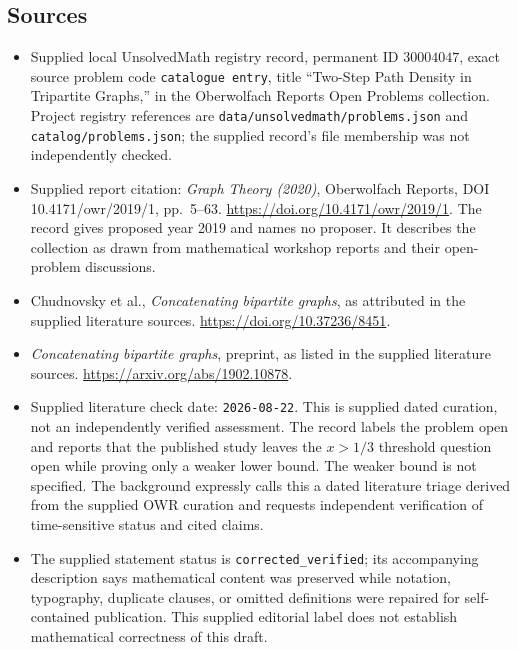 \documentclass[11pt]{article}
\begin{document}
\subsection{Sources}
\begin{itemize}
\item Supplied local UnsolvedMath registry record, permanent ID \(30004047\), exact source problem code \texttt{catalogue entry}, title ``Two-Step Path Density in Tripartite Graphs,'' in the Oberwolfach Reports Open Problems collection. Project registry references are \texttt{data/unsolvedmath/problems.json} and \texttt{catalog/problems.json}; the supplied record's file membership was not independently checked.
\item Supplied report citation: \emph{Graph Theory (2020)}, Oberwolfach Reports, DOI 10.4171/owr/2019/1, pp.\ 5--63. \url{https://doi.org/10.4171/owr/2019/1}. The record gives proposed year 2019 and names no proposer. It describes the collection as drawn from mathematical workshop reports and their open-problem discussions.
\item Chudnovsky et al., \emph{Concatenating bipartite graphs}, as attributed in the supplied literature sources. \url{https://doi.org/10.37236/8451}.
\item \emph{Concatenating bipartite graphs}, preprint, as listed in the supplied literature sources. \url{https://arxiv.org/abs/1902.10878}.
\item Supplied literature check date: \texttt{2026-08-22}. This is supplied dated curation, not an independently verified assessment. The record labels the problem open and reports that the published study leaves the \(x>1/3\) threshold question open while proving only a weaker lower bound. The weaker bound is not specified. The background expressly calls this a dated literature triage derived from the supplied OWR curation and requests independent verification of time-sensitive status and cited claims.
\item The supplied statement status is \texttt{corrected\_verified}; its accompanying description says mathematical content was preserved while notation, typography, duplicate clauses, or omitted definitions were repaired for self-contained publication. This supplied editorial label does not establish mathematical correctness of this draft.
\end{itemize}
\end{document}
